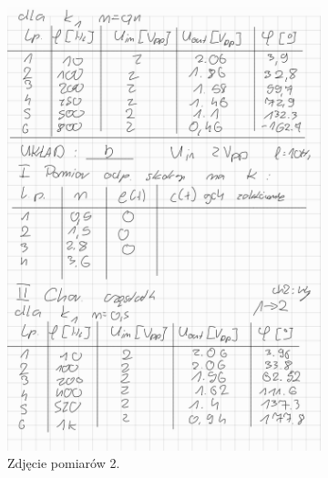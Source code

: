 \documentclass[12pt,a4paper]{article}
\begin{document}
\begin{figure}[H]
\begin{subfigure}[b]{0.46\textwidth}
			\includegraphics[width=\textwidth]{zdjecia/2.png}
			\caption{Zdjęcie pomiarów 2.}
			\label{fig:pomiar2}
		\end{subfigure}
		\begin{subfigure}[b]{0.46\textwidth}
			\centering

\end{subfigure}
\end{figure}
\end{document}

